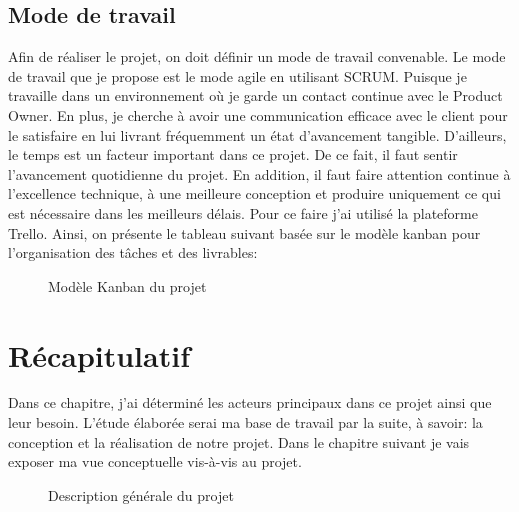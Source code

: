 \subsection{Mode de travail}
Afin de réaliser le projet, on doit définir un mode de travail convenable. Le mode de
travail que je propose est le mode agile en utilisant SCRUM. Puisque je travaille
dans un environnement où je garde un contact continue avec le Product Owner. En
plus, je cherche à avoir une communication efficace avec le client pour le
satisfaire en lui livrant fréquemment un état d'avancement tangible.
D'ailleurs, le temps est un facteur important dans ce projet. De ce fait, il faut sentir
l’avancement quotidienne du projet. En addition, il faut faire attention continue à
l’excellence technique, à une meilleure conception et produire uniquement ce qui est
nécessaire dans les meilleurs délais. Pour ce faire j'ai utilisé la plateforme Trello. Ainsi, on présente le tableau suivant basée sur le modèle kanban pour l'organisation des tâches et des livrables:
\begin{figure}[H]
    \begin{center}
        \caption{Modèle Kanban du projet}
    \end{center}
\end{figure}
\section{Récapitulatif}
Dans ce chapitre, j'ai déterminé les acteurs principaux dans ce projet ainsi que leur
besoin. L'étude élaborée serai ma base de travail par la suite, à
savoir: la conception et la réalisation de notre projet. Dans le chapitre suivant je vais
exposer ma vue conceptuelle vis-à-vis au projet.
\begin{figure}[H]
    \begin{center}
        \caption{Description générale du projet}
    \end{center}
\end{figure}